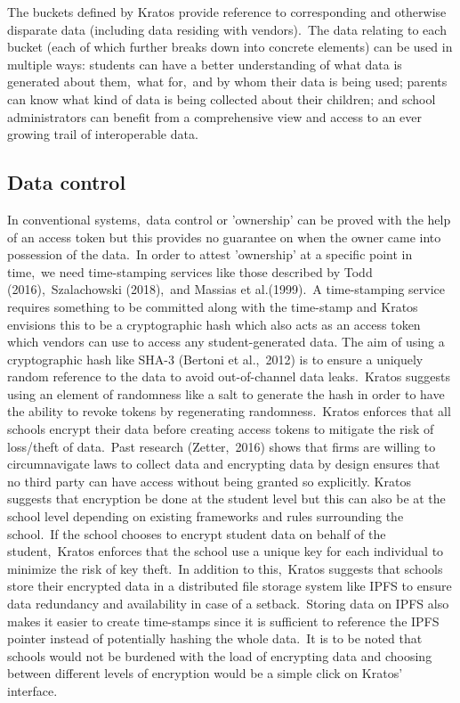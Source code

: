 \documentclass{article}
\begin{document}
\bigbreak
The buckets defined by Kratos provide reference to corresponding and otherwise disparate data (including data residing with vendors).\ The data relating to each bucket (each of which further breaks down into concrete elements) can be used in multiple ways: students can have a better understanding of what data is generated about them,\ what for,\ and by whom their data is being used; parents can know what kind of data is being collected about their children; and school administrators can benefit from a comprehensive view and access to an ever growing trail of interoperable data.\ 

\subsection{Data control}
In conventional systems,\ data control or 'ownership' can be proved with the help of an access token but this provides no guarantee on when the owner came into possession of the data.\ In order to attest 'ownership' at a specific point in time,\ we need time-stamping services like those described by Todd (2016),\ Szalachowski (2018),\ and Massias et al.(1999).\ A time-stamping service requires something to be committed along with the time-stamp and Kratos envisions this to be a cryptographic hash which also acts as an access token which vendors can use to access any student-generated data.
\bigbreak
The aim of using a cryptographic hash like SHA-3 (Bertoni et al.,\ 2012) is to ensure a uniquely random reference to the data to avoid out-of-channel data leaks.\ Kratos suggests using an element of randomness like a salt to generate the hash in order to have the ability to revoke tokens by regenerating randomness.\ Kratos enforces that all schools encrypt their data before creating access tokens to mitigate the risk of loss/theft of data.\ Past research (Zetter,\ 2016) shows that firms are willing to circumnavigate laws to collect data and encrypting data by design ensures that no third party can have access without being granted so explicitly.
\bigbreak
Kratos suggests that encryption be done at the student level but this can also be at the school level depending on existing frameworks and rules surrounding the school.\ If the school chooses to encrypt student data on behalf of the student,\ Kratos enforces that the school use a unique key for each individual to minimize the risk of key theft.\ In addition to this,\ Kratos suggests that schools store their encrypted data in a distributed file storage system like IPFS to ensure data redundancy and availability in case of a setback.\ Storing data on IPFS also makes it easier to create time-stamps since it is sufficient to reference the IPFS pointer instead of potentially hashing the whole data.\ It is to be noted that schools would not be burdened with the load of encrypting data and choosing between different levels of encryption would be a simple click on Kratos' interface.
\end{document}
